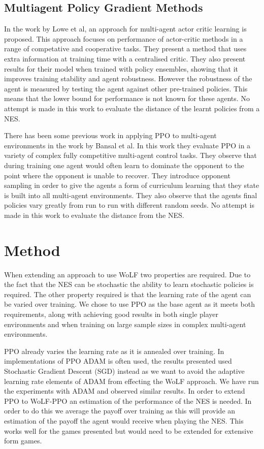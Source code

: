 \documentclass[conference]{IEEEtran}
\begin{document}
\subsection{Multiagent Policy Gradient Methods}

In the work by Lowe et al\cite{lowe2017multi}, an approach for multi-agent actor critic learning is proposed. This approach focuses on performance of actor-critic methods in a range of competative and cooperative tasks. They present a method that uses extra information at training time with a centralised critic. They also present results for their model when trained with policy ensembles, showing that it improves training stability and agent robustness. However the robustness of the agent is measured by testing the agent against other pre-trained policies. This means that the lower bound for performance is not known for these agents. No attempt is made in this work to evaluate the distance of the learnt policies from a NES.

There has been some previous work in applying PPO to multi-agent environments in the work by Bansal et al\cite{bansal2017emergent}. In this work they evaluate PPO in a variety of complex fully competitive multi-agent control tasks. They observe that during training one agent would often learn to dominate the opponent to the point where the opponent is unable to recover. They introduce opponent sampling in order to give the agents a form of curriculum learning that they state is built into all multi-agent environments. They also observe that the agents final policies vary greatly from run to run with different random seeds. No attempt is made in this work to evaluate the distance from the NES.

\section{Method}

When extending an approach to use WoLF two properties are required. Due to the fact that the NES can be stochastic the ability to learn stochastic policies is required. The other property required is that the learning rate of the agent can be varied over training. We chose to use PPO as the base agent as it meets both requirements, along with achieving good results in both single player environments and when training on large sample sizes in complex multi-agent environments\cite{OpenAI_dota}. 

PPO already varies the learning rate as it is annealed over training. In implementations of PPO ADAM is often used, the results presented used Stochastic Gradient Descent (SGD) instead as we want to avoid the adaptive learning rate elements of ADAM from effecting the WoLF approach. We have run the experiments with ADAM and observed similar results. In order to extend PPO to WoLF-PPO an estimation of the performance of the NES is needed. In order to do this we average the payoff over training as this will provide an estimation of the payoff the agent would receive when playing the NES. This works well for the games presented but would need to be extended for extensive form games.
\end{document}
